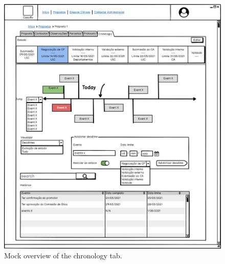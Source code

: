 \begin{figure}[H]
    \centering
    \includegraphics[scale=0.35]{images/proposta-cronologia.png}
    \caption{Mock overview of the chronology tab.}
    \label{fig:proposta-cronologia}
\end{figure}



